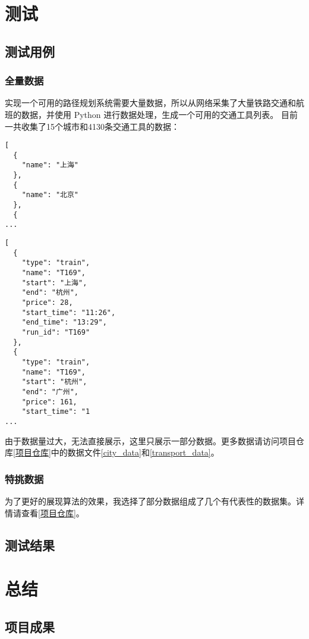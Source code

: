 \documentclass[10pt]{article}
\begin{document}
    \section{测试}

    \subsection{测试用例}

    \subsubsection{全量数据}

    实现一个可用的路径规划系统需要大量数据，所以从网络采集了大量铁路交通和航班的数据，并使用 Python 进行数据处理，生成一个可用的交通工具列表。
    目前一共收集了15个城市和4130条交通工具的数据：
    \begin{lstlisting}
[
  {
    "name": "上海"
  },
  {
    "name": "北京"
  },
  {
...
    \end{lstlisting}

    \begin{lstlisting}
[
  {
    "type": "train",
    "name": "T169",
    "start": "上海",
    "end": "杭州",
    "price": 28,
    "start_time": "11:26",
    "end_time": "13:29",
    "run_id": "T169"
  },
  {
    "type": "train",
    "name": "T169",
    "start": "杭州",
    "end": "广州",
    "price": 161,
    "start_time": "1
...
    \end{lstlisting}
    由于数据量过大，无法直接展示，这里只展示一部分数据。更多数据请访问项目仓库\ref{项目仓库}中的数据文件\ref{city_data}和\ref{transport_data}。
    \subsubsection{特挑数据}
    为了更好的展现算法的效果，我选择了部分数据组成了几个有代表性的数据集。详情请查看\ref{项目仓库}。
    \subsection{测试结果}



    \section{总结}

    \subsection{项目成果}
\end{document}
